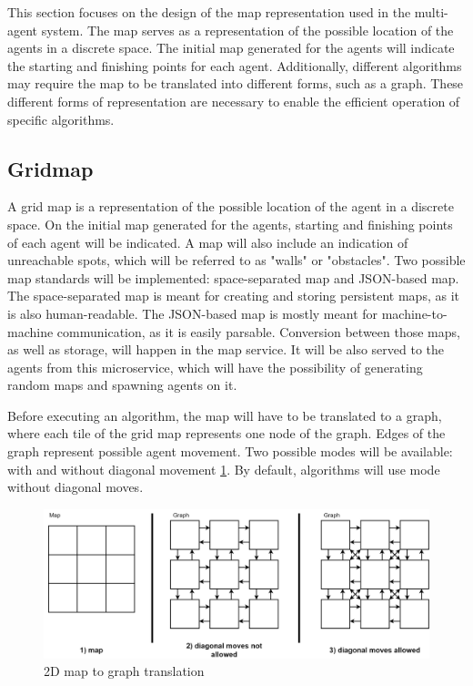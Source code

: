 This section focuses on the design of the map representation used in the multi-agent system. The map serves as a representation of the possible location of the agents in a discrete space. The initial map generated for the agents will indicate the starting and finishing points for each agent. Additionally, different algorithms may require the map to be translated into different forms, such as a graph. These different forms of representation are necessary to enable the efficient operation of specific algorithms. 

\subsection{Gridmap}
A grid map is a representation of the possible location of the agent in a discrete space. On the initial map generated for the agents, starting and finishing points of each agent will be indicated. A map will also include an indication of unreachable spots, which will be referred to as "walls" or "obstacles". Two possible map standards will be implemented: space-separated map and JSON-based map. The space-separated map is meant for creating and storing persistent maps, as it is also human-readable. The JSON-based map is mostly meant for machine-to-machine communication, as it is easily parsable. Conversion between those maps, as well as storage, will happen in the map service. It will be also served to the agents from this microservice, which will have the possibility of generating random maps and spawning agents on it.

Before executing an algorithm, the map will have to be translated to a graph, where each tile of the grid map represents one node of the graph. Edges of the graph represent possible agent movement. Two possible modes will be available: with and without diagonal movement \ref{fig:map_2D}. By default, algorithms will use mode without diagonal moves.

\begin{figure}[H]
    \centering
    \includegraphics[width=\textwidth]{pictures/map_2d.png}
    \caption{ 2D map to graph translation }
    \label{fig:map_2D}
\end{figure}


